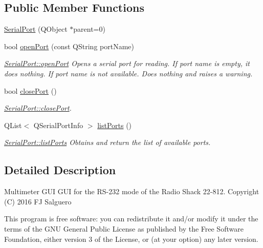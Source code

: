 \subsection*{Public Member Functions}
\begin{DoxyCompactItemize}
\item 
\hyperlink{classSerialPort_ae68e4a28e607b4acbab2c2a894cb3e2b}{Serial\-Port} (Q\-Object $\ast$parent=0)
\item 
bool \hyperlink{classSerialPort_a746e1ff02d45d8bf6b94e8bcbde6bb0d}{open\-Port} (const Q\-String port\-Name)
\begin{DoxyCompactList}\small\item\em \hyperlink{classSerialPort_a746e1ff02d45d8bf6b94e8bcbde6bb0d}{Serial\-Port\-::open\-Port} Opens a serial port for reading. If port name is empty, it does nothing. If port name is not available. Does nothing and raises a warning. \end{DoxyCompactList}\item 
bool \hyperlink{classSerialPort_a71c52f501f57ab491d0dc83cbc5e6a14}{close\-Port} ()
\begin{DoxyCompactList}\small\item\em \hyperlink{classSerialPort_a71c52f501f57ab491d0dc83cbc5e6a14}{Serial\-Port\-::close\-Port}. \end{DoxyCompactList}\item 
Q\-List$<$ Q\-Serial\-Port\-Info $>$ \hyperlink{classSerialPort_acd94c96dd2608f90a9ead0ced2742d17}{list\-Ports} ()
\begin{DoxyCompactList}\small\item\em \hyperlink{classSerialPort_acd94c96dd2608f90a9ead0ced2742d17}{Serial\-Port\-::list\-Ports} Obtains and return the list of available ports. \end{DoxyCompactList}\end{DoxyCompactItemize}


\subsection{Detailed Description}
Multimeter G\-U\-I G\-U\-I for the R\-S-\/232 mode of the Radio Shack 22-\/812. Copyright (C) 2016 F\-J Salguero

This program is free software\-: you can redistribute it and/or modify it under the terms of the G\-N\-U General Public License as published by the Free Software Foundation, either version 3 of the License, or (at your option) any later version.

